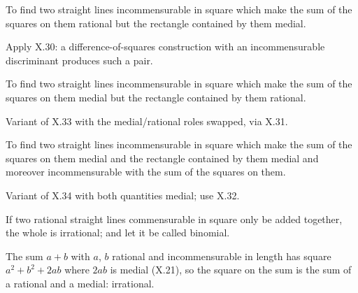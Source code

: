 \begin{claim}
\label{prop:X.33}
To find two straight lines incommensurable in square which make the
sum of the squares on them rational but the rectangle contained by
them medial.
\end{claim}
\begin{evidence}[Proof of X.33]
\label{ev:X.33}
Apply X.30: a difference-of-squares construction with an
incommensurable discriminant produces such a pair.
\end{evidence}

\begin{claim}
\label{prop:X.34}
To find two straight lines incommensurable in square which make the
sum of the squares on them medial but the rectangle contained by
them rational.
\end{claim}
\begin{evidence}[Proof of X.34]
\label{ev:X.34}
Variant of X.33 with the medial/rational roles swapped, via X.31.
\end{evidence}

\begin{claim}
\label{prop:X.35}
To find two straight lines incommensurable in square which make the
sum of the squares on them medial and the rectangle contained by
them medial and moreover incommensurable with the sum of the squares
on them.
\end{claim}
\begin{evidence}[Proof of X.35]
\label{ev:X.35}
Variant of X.34 with both quantities medial; use X.32.
\end{evidence}

\begin{claim}
\label{prop:X.36}
If two rational straight lines commensurable in square only be added
together, the whole is irrational; and let it be called binomial.
\end{claim}
\begin{evidence}[Proof of X.36]
\label{ev:X.36}
The sum $a + b$ with $a$, $b$ rational and incommensurable in length
has square $a^2 + b^2 + 2ab$ where $2ab$ is medial (X.21), so the
square on the sum is the sum of a rational and a medial: irrational.
\end{evidence}

